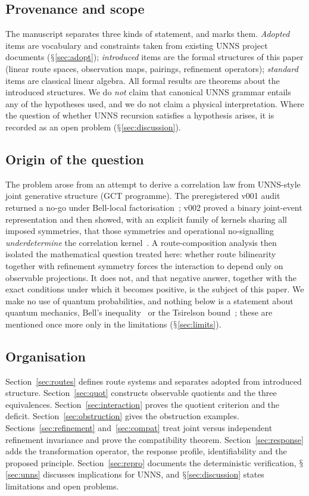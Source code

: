 \documentclass[11pt,a4paper]{article}
\renewcommand{\S}{\ensuremath{\mathsection}}
\theoremstyle{plain}
\theoremstyle{definition}
\begin{document}
\subsection{Provenance and scope}
The manuscript separates three kinds of statement, and marks them.
\emph{Adopted} items are vocabulary and constraints taken from existing UNNS project documents (\S\ref{sec:adopt}); \emph{introduced} items are the formal structures of this paper (linear route spaces, observation maps, pairings, refinement operators); \emph{standard} items are classical linear algebra.
All formal results are theorems about the introduced structures.
We do \emph{not} claim that canonical UNNS grammar entails any of the hypotheses used, and we do not claim a physical interpretation.
Where the question of whether UNNS recursion satisfies a hypothesis arises, it is recorded as an open problem (\S\ref{sec:discussion}).

\subsection{Origin of the question}
The problem arose from an attempt to derive a correlation law from UNNS-style joint generative structure (GCT programme).
The preregistered v001 audit returned a no-go under Bell-local factorisation~\cite{G1,G6}; v002 proved a binary joint-event representation and then showed, with an explicit family of kernels sharing all imposed symmetries, that those symmetries and operational no-signalling \emph{underdetermine} the correlation kernel~\cite{G2,G4}.
A route-composition analysis then isolated the mathematical question treated here: whether route bilinearity together with refinement symmetry forces the interaction to depend only on observable projections.
It does not, and that negative answer, together with the exact conditions under which it becomes positive, is the subject of this paper.
We make no use of quantum probabilities, and nothing below is a statement about quantum mechanics, Bell's inequality~\cite{Bel64,CHSH69} or the Tsirelson bound~\cite{Tsi80}; these are mentioned once more only in the limitations (\S\ref{sec:limits}).

\subsection{Organisation}
Section~\ref{sec:routes} defines route systems and separates adopted from introduced structure.
Section~\ref{sec:quot} constructs observable quotients and the three equivalences.
Section~\ref{sec:interaction} proves the quotient criterion and the deficit.
Section~\ref{sec:obstruction} gives the obstruction examples.
Sections~\ref{sec:refinement} and~\ref{sec:compat} treat joint versus independent refinement invariance and prove the compatibility theorem.
Section~\ref{sec:response} adds the transformation operator, the response profile, identifiability and the proposed principle.
Section~\ref{sec:repro} documents the deterministic verification, \S\ref{sec:unns} discusses implications for UNNS, and \S\ref{sec:discussion} states limitations and open problems.
\end{document}
